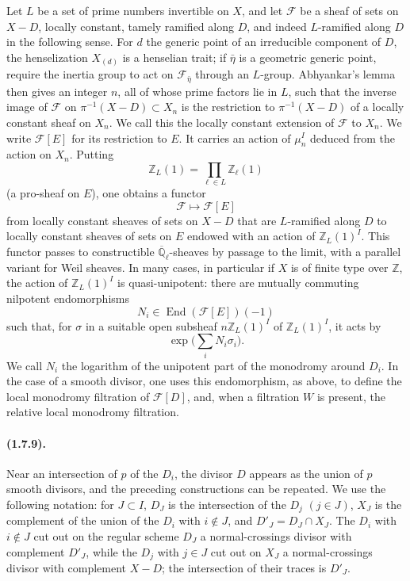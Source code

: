 \documentclass[11pt]{article}
\theoremstyle{remark}
\newcommand{\Qlb}{\overline{\mathbb{Q}}_\ell}
\newcommand{\ZZ}{\mathbb{Z}}
\newcommand{\End}{\operatorname{End}}
\begin{document}
Let $L$ be a set of prime numbers invertible on $X$, and let $\mathcal F$ be a sheaf of sets on $X-D$, locally constant, tamely ramified along $D$, and indeed $L$-ramified along $D$ in the following sense. For $d$ the generic point of an irreducible component of $D$, the henselization $X_{(d)}$ is a henselian trait; if $\bar\eta$ is a geometric generic point, require the inertia group to act on $\mathcal F_{\bar\eta}$ through an $L$-group. Abhyankar's lemma then gives an integer $n$, all of whose prime factors lie in $L$, such that the inverse image of $\mathcal F$ on $\pi^{-1}(X-D)\subset X_n$ is the restriction to $\pi^{-1}(X-D)$ of a locally constant sheaf on $X_n$. We call this the locally constant extension of $\mathcal F$ to $X_n$. We write $\mathcal F[E]$ for its restriction to $E$. It carries an action of $\mu_n^I$ deduced from the action on $X_n$. Putting
\[
\ZZ_L(1)=\prod_{\ell\in L}\ZZ_\ell(1)
\]
(a pro-sheaf on $E$), one obtains a functor
\[
\mathcal F\longmapsto \mathcal F[E]
\]
from locally constant sheaves of sets on $X-D$ that are $L$-ramified along $D$ to locally constant sheaves of sets on $E$ endowed with an action of $\ZZ_L(1)^I$. This functor passes to constructible $\Qlb$-sheaves by passage to the limit, with a parallel variant for Weil sheaves. In many cases, in particular if $X$ is of finite type over $\ZZ$, the action of $\ZZ_L(1)^I$ is quasi-unipotent: there are mutually commuting nilpotent endomorphisms
\[
N_i\in \End(\mathcal F[E])(-1)
\]
such that, for $\sigma$ in a suitable open subsheaf $n\ZZ_L(1)^I$ of $\ZZ_L(1)^I$, it acts by
\[
\exp\bigl(\sum_i N_i\sigma_i\bigr).
\]
We call $N_i$ the logarithm of the unipotent part of the monodromy around $D_i$. In the case of a smooth divisor, one uses this endomorphism, as above, to define the local monodromy filtration of $\mathcal F[D]$, and, when a filtration $W$ is present, the relative local monodromy filtration.

\paragraph{(1.7.9).}
Near an intersection of $p$ of the $D_i$, the divisor $D$ appears as the union of $p$ smooth divisors, and the preceding constructions can be repeated. We use the following notation: for $J\subset I$, $D_J$ is the intersection of the $D_j$ $(j\in J)$, $X_J$ is the complement of the union of the $D_i$ with $i\notin J$, and $D'_J=D_J\cap X_J$. The $D_i$ with $i\notin J$ cut out on the regular scheme $D_J$ a normal-crossings divisor with complement $D'_J$, while the $D_j$ with $j\in J$ cut out on $X_J$ a normal-crossings divisor with complement $X-D$; the intersection of their traces is $D'_J$.
\end{document}
